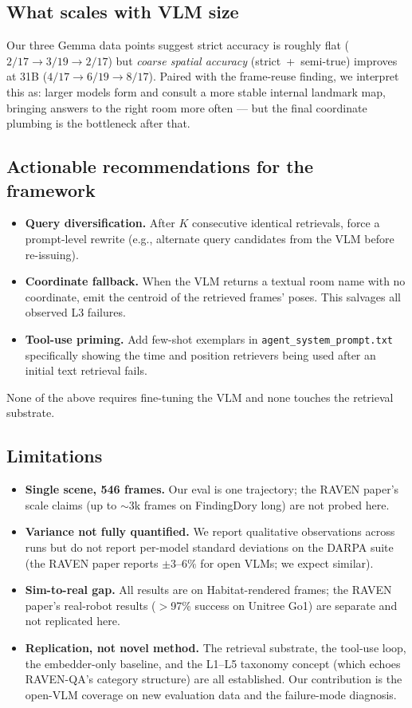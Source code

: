 \documentclass[11pt]{article}
\begin{document}
\subsection{What scales with VLM size}
Our three Gemma data points suggest strict accuracy is roughly flat ($2/17 \to 3/19 \to 2/17$) but \emph{coarse spatial accuracy} (strict~+~semi-true) improves at 31B ($4/17 \to 6/19 \to 8/17$). Paired with the frame-reuse finding, we interpret this as: larger models form and consult a more stable internal landmark map, bringing answers to the right room more often --- but the final coordinate plumbing is the bottleneck after that.

\subsection{Actionable recommendations for the framework}
\begin{itemize}[leftmargin=*,itemsep=2pt]
  \item \textbf{Query diversification.} After $K$ consecutive identical retrievals, force a prompt-level rewrite (e.g., alternate query candidates from the VLM before re-issuing).
  \item \textbf{Coordinate fallback.} When the VLM returns a textual room name with no coordinate, emit the centroid of the retrieved frames' poses. This salvages all observed L3 failures.
  \item \textbf{Tool-use priming.} Add few-shot exemplars in \texttt{agent\_system\_prompt.txt} specifically showing the time and position retrievers being used after an initial text retrieval fails.
\end{itemize}
None of the above requires fine-tuning the VLM and none touches the retrieval substrate.

\subsection{Limitations}
\begin{itemize}[leftmargin=*,itemsep=2pt]
  \item \textbf{Single scene, 546 frames.} Our eval is one trajectory; the RAVEN paper's scale claims (up to $\sim$3k frames on FindingDory long) are not probed here.
  \item \textbf{Variance not fully quantified.} We report qualitative observations across runs but do not report per-model standard deviations on the DARPA suite (the RAVEN paper reports $\pm 3$--$6\%$ for open VLMs; we expect similar).
  \item \textbf{Sim-to-real gap.} All results are on Habitat-rendered frames; the RAVEN paper's real-robot results ($>$97\% success on Unitree Go1) are separate and not replicated here.
  \item \textbf{Replication, not novel method.} The retrieval substrate, the tool-use loop, the embedder-only baseline, and the L1--L5 taxonomy concept (which echoes RAVEN-QA's category structure) are all established. Our contribution is the open-VLM coverage on new evaluation data and the failure-mode diagnosis.
\end{itemize}
\end{document}
